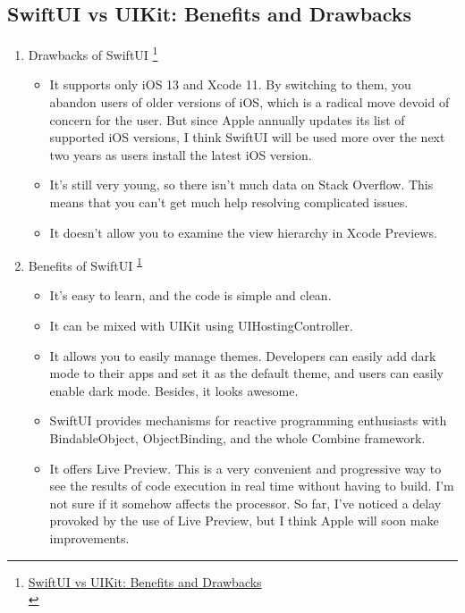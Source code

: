 \documentclass[a4paper,12pt]{article}
\begin{document}
\subsection{SwiftUI vs UIKit: Benefits and Drawbacks}
\label{sec:org62673be}
\begin{enumerate}
\item Drawbacks of SwiftUI \footnote{\href{https://medium.com/@SteelKiwiDev/swiftui-vs-uikit-benefits-and-drawbacks-6a540cced684}{SwiftUI vs UIKit: Benefits and Drawbacks}\\\label{orge908e69}}
\label{sec:orgbc528df}
\begin{itemize}
\item It supports only iOS 13 and Xcode 11. By switching to them, you abandon users of older versions of iOS, which is a radical move devoid of concern for the user. But since Apple annually updates its list of supported iOS versions, I think SwiftUI will be used more over the next two years as users install the latest iOS version.\\
\item It’s still very young, so there isn’t much data on Stack Overflow. This means that you can’t get much help resolving complicated issues.\\
\item It doesn’t allow you to examine the view hierarchy in Xcode Previews.\\
\end{itemize}
\item Benefits of SwiftUI \textsuperscript{\ref{orge908e69}}
\label{sec:org9fe8909}
\begin{itemize}
\item It’s easy to learn, and the code is simple and clean.\\
\item It can be mixed with UIKit using UIHostingController.\\
\item It allows you to easily manage themes. Developers can easily add dark mode to their apps and set it as the default theme, and users can easily enable dark mode. Besides, it looks awesome.\\
\item SwiftUI provides mechanisms for reactive programming enthusiasts with BindableObject, ObjectBinding, and the whole Combine framework.\\
\item It offers Live Preview. This is a very convenient and progressive way to see the results of code execution in real time without having to build. I’m not sure if it somehow affects the processor. So far, I’ve noticed a delay provoked by the use of Live Preview, but I think Apple will soon make improvements.\\

\end{itemize}
\end{enumerate}
\end{document}
